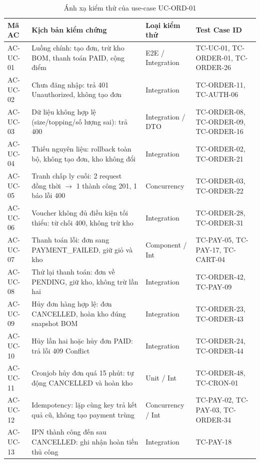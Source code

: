 \begin{table}[H]
\centering\footnotesize
\caption{Ánh xạ kiểm thử của use-case UC-ORD-01}
\label{tab:uc-order-mapping}
\begin{tabularx}{\textwidth}{@{}p{1.7cm} X p{2.2cm} p{2.7cm}@{}}
\toprule
\textbf{Mã AC} & \textbf{Kịch bản kiểm chứng} & \textbf{Loại kiểm thử} & \textbf{Test Case ID} \\
\midrule
AC-UC-01 & Luồng chính: tạo đơn, trừ kho BOM, thanh toán PAID, cộng điểm & E2E / Integration & TC-UC-01, TC-ORDER-01, TC-ORDER-26 \\
AC-UC-02 & Chưa đăng nhập: trả 401 Unauthorized, không tạo đơn & Integration & TC-ORDER-11, TC-AUTH-06 \\
AC-UC-03 & Dữ liệu không hợp lệ (size/topping/số lượng sai): trả 400 & Integration / DTO & TC-ORDER-08, TC-ORDER-09, TC-ORDER-16 \\
AC-UC-04 & Thiếu nguyên liệu: rollback toàn bộ, không tạo đơn, kho không đổi & Integration & TC-ORDER-02, TC-ORDER-21 \\
AC-UC-05 & Tranh chấp ly cuối: 2 request đồng thời $\rightarrow$ 1 thành công 201, 1 báo lỗi 400 & Concurrency & TC-ORDER-03, TC-ORDER-22 \\
AC-UC-06 & Voucher không đủ điều kiện tối thiểu: từ chối 400, không trừ kho & Integration & TC-ORDER-28, TC-ORDER-31 \\
AC-UC-07 & Thanh toán lỗi: đơn sang PAYMENT\_FAILED, giữ giỏ và kho & Component / Int & TC-PAY-05, TC-PAY-17, TC-CART-04 \\
AC-UC-08 & Thử lại thanh toán: đơn về PENDING, giữ kho, không trừ lần hai & Integration & TC-ORDER-42, TC-PAY-09 \\
AC-UC-09 & Hủy đơn hàng hợp lệ: đơn CANCELLED, hoàn kho đúng snapshot BOM & Integration & TC-ORDER-23, TC-ORDER-43 \\
AC-UC-10 & Hủy lần hai hoặc hủy đơn PAID: trả lỗi 409 Conflict & Integration & TC-ORDER-24, TC-ORDER-44 \\
AC-UC-11 & Cronjob hủy đơn quá 15 phút: tự động CANCELLED và hoàn kho & Unit / Int & TC-ORDER-48, TC-CRON-01 \\
AC-UC-12 & Idempotency: lặp cùng key trả kết quả cũ, không tạo payment trùng & Concurrency / Int & TC-PAY-02, TC-PAY-03, TC-ORDER-34 \\
AC-UC-13 & IPN thành công đến sau CANCELLED: ghi nhận hoàn tiền thủ công & Integration & TC-PAY-18 \\
\bottomrule
\end{tabularx}
\end{table}

